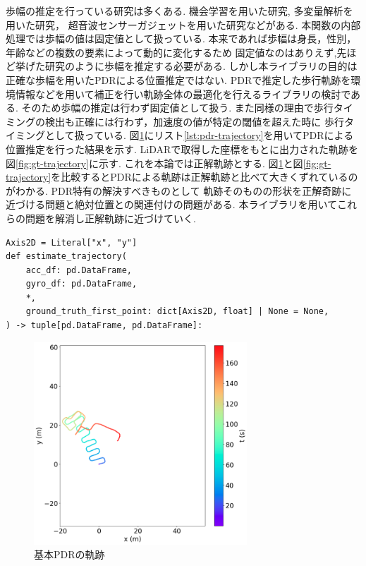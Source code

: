歩幅の推定を行っている研究は多くある.
機会学習を用いた研究\cite{stride-length-auto-learning},
多変量解析を用いた研究\cite{stride-length-multi}，
超音波センサーガジェットを用いた研究\cite{stride-length-ultrasonic}などがある.
本関数の内部処理では歩幅の値は固定値として扱っている.
本来であれば歩幅は身長，性別，年齢などの複数の要素によって動的に変化するため
固定値なのはありえず,先ほど挙げた研究のように歩幅を推定する必要がある.
しかし本ライブラリの目的は正確な歩幅を用いたPDRによる位置推定ではない.
PDRで推定した歩行軌跡を環境情報などを用いて補正を行い軌跡全体の最適化を行えるライブラリの検討である.
そのため歩幅の推定は行わず固定値として扱う.
また同様の理由で歩行タイミングの検出も正確には行わず，加速度の値が特定の閾値を超えた時に
歩行タイミングとして扱っている.
図\ref{fig:pdr}にリスト\ref{lst:pdr-trajectory}を用いてPDRによる位置推定を行った結果を示す.
LiDARで取得した座標をもとに出力された軌跡を図\ref{fig:gt-trajectory}に示す.
これを本論では正解軌跡とする.
図\ref{fig:pdr}と図\ref*{fig:gt-trajectory}を比較するとPDRによる軌跡は正解軌跡と比べて大きくずれているのがわかる.
PDR特有の解決すべきものとして
軌跡そのものの形状を正解奇跡に近づける問題と絶対位置との関連付けの問題がある.
本ライブラリを用いてこれらの問題を解消し正解軌跡に近づけていく.

\begin{lstlisting}[caption={基本PDR}, label=lst:pdr-trajectory]
Axis2D = Literal["x", "y"]
def estimate_trajectory(
    acc_df: pd.DataFrame,
    gyro_df: pd.DataFrame,
    *,
    ground_truth_first_point: dict[Axis2D, float] | None = None,
) -> tuple[pd.DataFrame, pd.DataFrame]:
\end{lstlisting}

\begin{figure}[ht]
	\centering
	\includegraphics[width=80mm]{image/pdr.jpg}
	\caption{基本PDRの軌跡}    \label{fig:pdr}
\end{figure}

